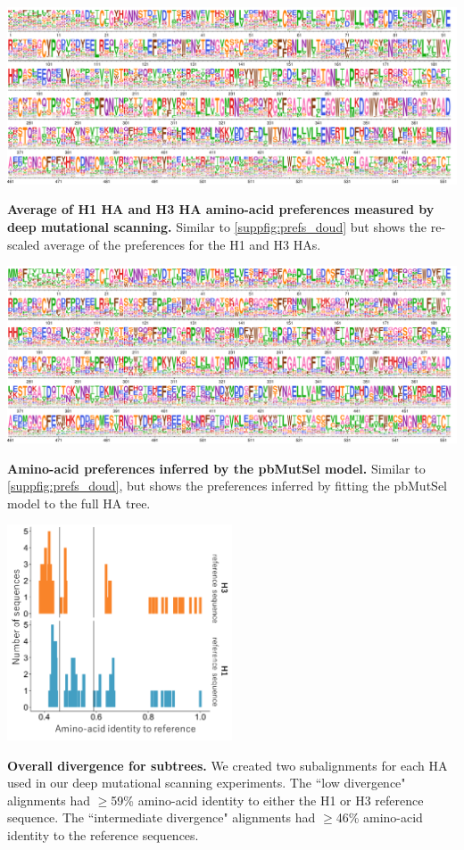 \documentclass[11pt]{article}
\begin{document}
\begin{suppfig}[H]
\centerline{\includegraphics[width=\textwidth]{figures/prefs_average}}
\caption{\label{suppfig:prefs_average}
\textbf{Average of H1 HA  and H3 HA amino-acid preferences measured by deep mutational scanning.}
Similar to \ref{suppfig:prefs_doud} but shows the re-scaled average of the preferences for the H1 and H3 HAs.
}
\end{suppfig}
\clearpage 

\begin{suppfig}[H]
\centerline{\includegraphics[width=\textwidth]{figures/prefs_mutSel}}
\caption{\label{suppfig:prefs_mutSel}
\textbf{Amino-acid preferences inferred by the pbMutSel model.}
Similar to \ref{suppfig:prefs_doud}, but shows the preferences inferred by fitting the pbMutSel model to the full HA tree.
}
\end{suppfig}
\clearpage 

\begin{suppfig}[H]
\centerline{\includegraphics[width=0.50\textwidth]{figures/divergence_distances.pdf}}
\caption{\label{suppfig:subalignments}
\textbf{Overall divergence for subtrees.}
We created two subalignments for each HA used in our deep mutational scanning experiments. 
The ``low divergence" alignments had $\ge$59\% amino-acid identity to either the H1 or H3 reference sequence. 
The ``intermediate divergence" alignments had $\ge$46\% amino-acid identity to the reference sequences.
}
\end{suppfig}
\clearpage 
\end{document}
